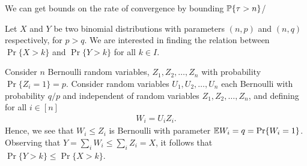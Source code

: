 \documentclass[a4paper,10pt,english]{article}
\begin{document}
\begin{rem} We can get bounds on the rate of convergence by bounding $\P\{\tau > n\}$/
\end{rem}
\begin{exmp} 
Let $X$ and $Y$ be two binomial distributions with parameters $(n,p)$ and $(n,q)$ respectively, for $p > q$. 
We are interested in finding the relation between $\Pr\{X > k\}$ and $\Pr\{Y > k\}$  for all $k \in I$. 

Consider $n$ Bernoulli random variables, $Z_1,Z_2, \ldots,Z_n$ with probability $\Pr\{Z_i = 1\} = p$. 
Consider random variables $U_1, U_2, \ldots, U_n$ each Bernoulli with probability $q/p$ and independent of random variables $Z_1,Z_2, \ldots, Z_n$, and defining for all $i \in [n]$
\begin{align*}
W_i = U_iZ_i.
\end{align*}
Hence, we see that $W_i \leq Z_i$ is Bernoulli with parameter $\E W_i = q = \Pr\{W_i = 1\}$.
Observing that $Y = \sum_i W_i \leq \sum_i Z_i  = X$, it follows that $\Pr\{Y > k\} \leq  \Pr\{X > k\}$. 
\end{exmp}
\end{document}
